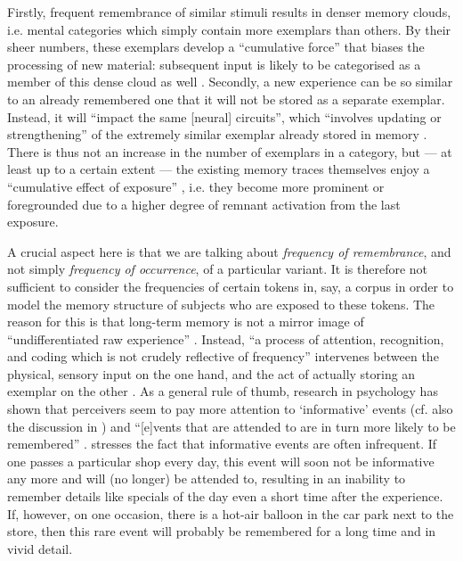 Firstly, frequent remembrance of similar stimuli results in denser memory clouds, i.e. mental categories which simply contain more exemplars than others.
By their sheer numbers, these exemplars develop a ``cumulative force'' that biases the processing of new material: subsequent input is likely to be categorised as a member of this dense cloud as well \parencite[cf.][524]{pierrehumbert2006}.
Secondly, a new experience can be so similar to an already remembered one that it will not be stored as a separate exemplar.
Instead, it will ``impact the same [neural] circuits'', which ``involves updating or strengthening'' of the extremely similar exemplar already stored in memory \parencite[525]{pierrehumbert2006}.
There is thus not an increase in the number of exemplars in a category, but --- at least up to a certain extent --- the existing memory traces themselves enjoy a ``cumulative effect of exposure'' \parencite[525]{pierrehumbert2006}, i.e. they become more prominent or foregrounded due to a higher degree of remnant activation from the last exposure.

A crucial aspect here is that we are talking about \emph{frequency of remembrance}, and not simply \emph{frequency of occurrence}, of a particular variant.
It is therefore not sufficient to consider the frequencies of certain tokens in, say, a corpus in order to model the memory structure of subjects who are exposed to these tokens.
The reason for this is that long-term memory is not a mirror image of ``undifferentiated raw experience'' \parencite[525]{pierrehumbert2006}.
Instead, ``a process of attention, recognition, and coding which is not crudely reflective of frequency'' intervenes between the physical, sensory input on the one hand, and the act of actually storing an exemplar on the other \parencite[525]{pierrehumbert2006}.
As a general rule of thumb, research in psychology has shown that perceivers seem to pay more attention to `informative' events (cf. also the discussion in \citealt{racz2013}) and ``[e]vents that are attended to are in turn more likely to be remembered'' \parencite[525]{pierrehumbert2006}.
\textcite[cf.][525]{pierrehumbert2006} stresses the fact that informative events are often infrequent.
If one passes a particular shop every day, this event will soon not be informative any more and will (no longer) be attended to, resulting in an inability to remember details like specials of the day even a short time after the experience.
If, however, on one occasion, there is a hot-air balloon in the car park next to the store, then this rare event will probably be remembered for a long time and in vivid detail.

